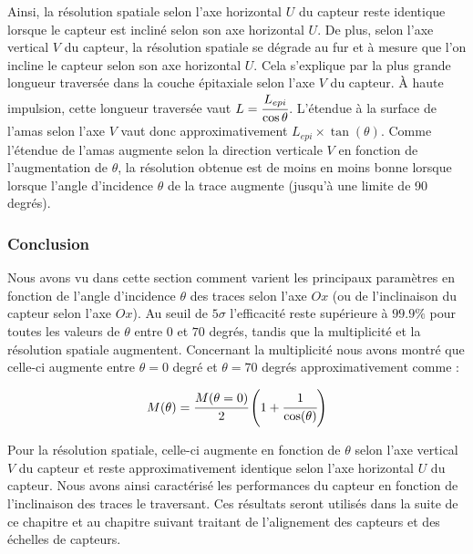    \medskip
   
   Ainsi, la r\'esolution spatiale selon l'axe horizontal $U$ du capteur reste identique lorsque le capteur est inclin\'e selon son axe horizontal $U$. De plus, selon l'axe vertical $V$ du capteur, la r\'esolution spatiale se d\'egrade au fur et \`a mesure que l'on incline le capteur selon son axe horizontal $U$. Cela s'explique par la plus grande longueur travers\'ee dans la couche \'epitaxiale selon l'axe $V$ du capteur. \`A haute impulsion, cette longueur travers\'ee vaut $L = \cfrac{ L_{epi} }{ \cos{\theta} }$. L'\'etendue \`a la surface de l'amas selon l'axe $V$ vaut donc approximativement $L_{epi} \times \tan(\theta)$. Comme l'\'etendue de l'amas augmente selon la direction verticale $V$ en fonction de l'augmentation de $\theta$, la résolution obtenue est de moins en moins bonne lorsque lorsque l'angle d'incidence $\theta$ de la trace augmente (jusqu'\`a une limite de 90 degr\'es).
   
   \subsubsection{Conclusion}
   
   Nous avons vu dans cette section comment varient les principaux param\`etres en fonction de l'angle d'incidence $\theta$ des traces selon l'axe $Ox$ (ou de l'inclinaison du capteur selon l'axe $Ox$). Au seuil de $5 \sigma$ l'efficacit\'e reste sup\'erieure \`a $99.9\%$ pour toutes les valeurs de $\theta$ entre $0$ et $70$ degr\'es, tandis que la multiplicit\'e et la r\'esolution spatiale augmentent. Concernant la multiplicit\'e nous avons montr\'e que celle-ci augmente entre $\theta = 0$ degr\'e et $\theta = 70$ degr\'es approximativement comme :
   
   \begin{equation}
    M(\theta) = \cfrac{M(\theta=0)}{2} \left( 1 + \cfrac{1}{\cos(\theta)} \right)
   \end{equation}   
   
   Pour la r\'esolution spatiale, celle-ci augmente en fonction de $\theta$ selon l'axe vertical $V$ du capteur et reste approximativement identique selon l'axe horizontal $U$ du capteur. Nous avons ainsi caract\'eris\'e les performances du capteur en fonction de l'inclinaison des traces le traversant. Ces r\'esultats seront utilis\'es dans la suite de ce chapitre et au chapitre suivant traitant de l'alignement des capteurs et des \'echelles de capteurs.
   
  
